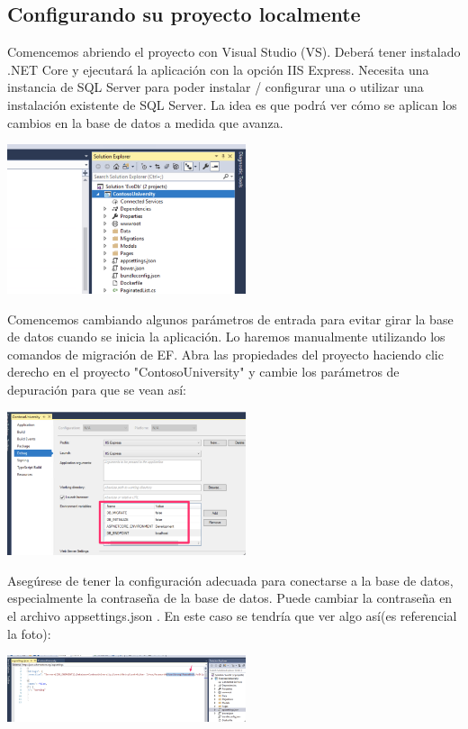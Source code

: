\documentclass[twoside,twocolumn]{article}
\begin{document}
\subsection{Configurando su proyecto localmente}
Comencemos abriendo el proyecto con Visual Studio (VS). Deberá tener instalado .NET Core y ejecutará la aplicación con la opción IIS Express. Necesita una instancia de SQL Server para poder instalar / configurar una o utilizar una instalación existente de SQL Server. La idea es que podrá ver cómo se aplican los cambios en la base de datos a medida que avanza.
\begin{center}
	\includegraphics[width=7cm]{./Imagenes/proyecto1} 
	\end{center}
Comencemos cambiando algunos parámetros de entrada para evitar girar la base de datos cuando se inicia la aplicación. Lo haremos manualmente utilizando los comandos de migración de EF. Abra las propiedades del proyecto haciendo clic derecho en el proyecto "ContosoUniversity" y cambie los parámetros de depuración para que se vean así:
\begin{center}
	\includegraphics[width=7cm]{./Imagenes/proyecto2} 
	\end{center}
Asegúrese de tener la configuración adecuada para conectarse a la base de datos, especialmente la contraseña de la base de datos. Puede cambiar la contraseña en el archivo appsettings.json . En este caso se tendría que ver algo así(es referencial la foto):
\begin{center}
	\includegraphics[width=7cm]{./Imagenes/proyecto3} 
	\end{center}
\end{document}
